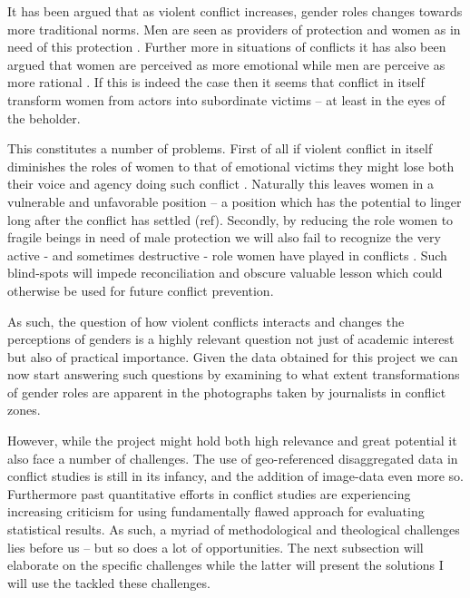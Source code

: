 \documentclass[a4paper]{article}
\begin{document}
It has been argued that as violent conflict increases, gender roles changes towards more traditional norms. Men are seen as providers of protection and women as in need of this protection \citep{elshtain1995women, carpenter2003women}. Further more in situations of conflicts it has also been argued that women are perceived as more emotional while men are perceive as more rational \citep{elshtain1993public}. If this is indeed the case then it seems that conflict in itself transform women from actors into subordinate victims -- at least in the eyes of the beholder.\par 

This constitutes a number of problems. First of all if violent conflict in itself diminishes the roles of women to that of emotional victims they might lose both their voice and agency doing such conflict \citep{hansen2000gender, hansen2000little}. Naturally this leaves women in a vulnerable and unfavorable position \citep[XXX]{hansen2000little} -- a position which has the potential to linger long after the conflict has settled (ref). Secondly, by reducing the role women to fragile beings in need of male protection we will also fail to recognize the very active - and sometimes destructive - role women have played in conflicts \citep[XXX]{hansen2000gender}. Such blind-spots will impede reconciliation and obscure valuable lesson which could otherwise be used for future conflict prevention.\par

As such, the question of how violent conflicts interacts and changes the perceptions of genders is a highly relevant question not just of academic interest but also of practical importance. Given the data obtained for this project we can now start answering such questions by examining to what extent transformations of gender roles are apparent in the photographs taken by journalists in conflict zones.\par

However, while the project might hold both high relevance and great potential it also face a number of challenges. The use of geo-referenced disaggregated data in conflict studies is still in its infancy, and the addition of image-data even more so. Furthermore past quantitative efforts in conflict studies are experiencing increasing criticism for using fundamentally flawed approach for evaluating statistical results. As such, a myriad of methodological and theological challenges lies before us -- but so does a lot of opportunities. The next subsection will elaborate on the specific challenges while the latter will present the solutions I will use the tackled these challenges.\par
\end{document}

